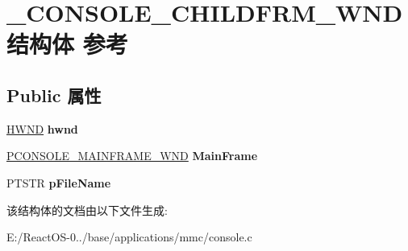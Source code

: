 \hypertarget{struct___c_o_n_s_o_l_e___c_h_i_l_d_f_r_m___w_n_d}{}\section{\+\_\+\+C\+O\+N\+S\+O\+L\+E\+\_\+\+C\+H\+I\+L\+D\+F\+R\+M\+\_\+\+W\+N\+D结构体 参考}
\label{struct___c_o_n_s_o_l_e___c_h_i_l_d_f_r_m___w_n_d}
\subsection*{Public 属性}
\begin{DoxyCompactItemize}
\item 
\mbox{\label{struct___c_o_n_s_o_l_e___c_h_i_l_d_f_r_m___w_n_d_a8d9579b9f9df6cc45840c456de14ebeb}} 
\hyperlink{interfacevoid}{H\+W\+ND} {\bfseries hwnd}
\item 
\mbox{\label{struct___c_o_n_s_o_l_e___c_h_i_l_d_f_r_m___w_n_d_a5dc76d5e935b67a65cf0e69e7f3c47cd}} 
\hyperlink{struct___c_o_n_s_o_l_e___m_a_i_n_f_r_a_m_e___w_n_d}{P\+C\+O\+N\+S\+O\+L\+E\+\_\+\+M\+A\+I\+N\+F\+R\+A\+M\+E\+\_\+\+W\+ND} {\bfseries Main\+Frame}
\item 
\mbox{\label{struct___c_o_n_s_o_l_e___c_h_i_l_d_f_r_m___w_n_d_a8260fe36a16f60622356591582ae4a07}} 
P\+T\+S\+TR {\bfseries p\+File\+Name}
\end{DoxyCompactItemize}


该结构体的文档由以下文件生成\+:\begin{DoxyCompactItemize}
\item 
E\+:/\+React\+O\+S-\/0../base/applications/mmc/console.\+c\end{DoxyCompactItemize}

